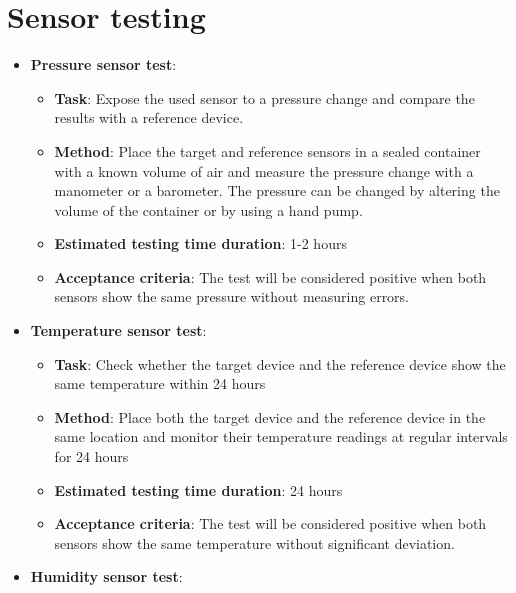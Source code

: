 \section{Sensor testing}\label{A22}

\begin{itemize}[labelwidth=0cm, leftmargin=0cm, itemindent=0.7cm, noitemsep, topsep=0pt, label={}]
\item \textbf{Pressure sensor test}:
\begin{itemize}[labelwidth=2cm, leftmargin=1.9cm, label=, noitemsep, topsep=2pt]
\item[\faTasks] \textbf{Task}: Expose the used sensor to a pressure change and compare the results with a reference device.
\item[\faFlask] \textbf{Method}: Place the target and reference sensors in a sealed container with a known volume of air and measure the pressure change with a manometer or a barometer. The pressure can be changed by altering the volume of the container or by using a hand pump.
\item[{\faHourglass[3]}] \textbf{Estimated testing time duration}: 1-2 hours
\item[{\faCheckSquare}] \textbf{Acceptance criteria}: The test will be considered positive when both sensors show the same pressure without measuring errors.
\end{itemize}
\item \textbf{Temperature sensor test}:
\begin{itemize}[labelwidth=2cm, leftmargin=1.9cm, label=, noitemsep, topsep=2pt]
\item[\faTasks] \textbf{Task}:  Check whether the target device and the reference device show the same temperature within 24 hours 
\item[\faFlask] \textbf{Method}: Place both the target device and the reference device in the same location and monitor their temperature readings at regular intervals for 24 hours
\item[{\faHourglass[3]}] \textbf{Estimated testing time duration}:  24 hours
\item[{\faCheckSquare}] \textbf{Acceptance criteria}: The test will be considered positive when both sensors show the same temperature without significant deviation.
\end{itemize}
\item \textbf{Humidity sensor test}:
\begin{itemize}[labelwidth=2cm, leftmargin=1.9cm, label=, noitemsep, topsep=2pt]

\end{itemize}
\end{itemize}
